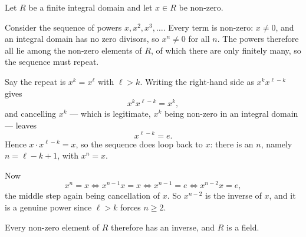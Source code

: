 \documentclass[11pt]{article}
\begin{document}
\begin{solution}
  Let $R$ be a finite integral domain and let $x \in R$ be non-zero.

  Consider the sequence of powers $x, x^{2}, x^{3}, \ldots$. Every term is
  non-zero: $x \neq 0$, and an integral domain has no zero divisors, so
  $x^{n} \neq 0$ for all $n$. The powers therefore all lie among the non-zero
  elements of $R$, of which there are only finitely many, so the sequence must
  repeat.

  Say the repeat is $x^{k} = x^{\ell}$ with $\ell > k$. Writing the right-hand
  side as $x^{k}x^{\ell-k}$ gives
  \[
    x^{k}x^{\ell-k} = x^{k},
  \]
  and cancelling $x^{k}$ --- which is legitimate, $x^{k}$ being non-zero in an
  integral domain --- leaves
  \[
    x^{\ell-k} = e.
  \]
  Hence $x \cdot x^{\ell-k} = x$, so the sequence does loop back to $x$: there
  is an $n$, namely $n = \ell - k + 1$, with $x^{n} = x$.

  Now
  \[
    x^{n} = x
    \iff x^{n-1}x = x
    \iff x^{n-1} = e
    \iff x^{n-2}x = e,
  \]
  the middle step again being cancellation of $x$. So $x^{n-2}$ is the inverse
  of $x$, and it is a genuine power since $\ell > k$ forces $n \geq 2$.

  Every non-zero element of $R$ therefore has an inverse, and $R$ is a field.
\end{solution}
\end{document}
